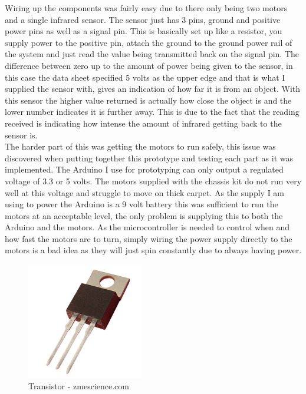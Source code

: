 Wiring up the components was fairly easy due to there only being two motors and a single infrared sensor.  The sensor just has 3 pins, ground and positive power pins as well as a signal pin.  This is basically set up like a resistor, you supply power to the positive pin, attach the ground to the ground power rail of the system and just read the value being transmitted back on the signal pin.  The difference between zero up to the amount of power being given to the sensor, in this case the data sheet specified 5 volts as the upper edge and that is what I supplied the sensor with, gives an indication of how far it is from an object.  With this sensor the higher value returned is actually how close the object is and the lower number indicates it is further away.  This is due to the fact that the reading received is indicating how intense the amount of infrared getting back to the sensor is.
\\The harder part of this was getting the motors to run safely, this issue was discovered when putting together this prototype and testing each part as it was implemented.  The Arduino I use for prototyping can only output a regulated voltage of 3.3 or 5 volts.  The motors supplied with the chassis kit do not run very well at this voltage and struggle to move on thick carpet.  As the supply I am using to power the Arduino is a 9 volt battery this was sufficient to run the motors at an acceptable level, the only problem is supplying this to both the Arduino and the motors.  As the microcontroller is needed to control when and how fast the motors are to turn, simply wiring the power supply directly to the motors is a bad idea as they will just spin constantly due to always having power.
\begin{figure}[H]
\centering
        \includegraphics[width=2.0in] {Images/transistor.jpg}
        \caption{Transistor - zmescience.com}
        \label{Transistor}
\end{figure}

